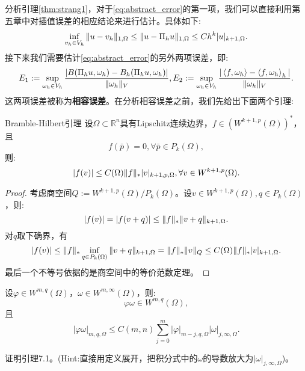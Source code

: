 分析引理\ref{thm:strang1}，对于\eqref{eq:abstract_error}的第一项，我们可以直接利用第五章中对插值误差的相应结论来进行估计。具体如下:
\begin{equation}
    \inf_{v_{h}\in V_{h}}\|u-v_{h}\|_{1,\Omega}\le\|u-\Pi_{h}u\|_{1,\Omega}\le Ch^{k}|u|_{k+1,\Omega}.
\end{equation}
接下来我们需要估计\eqref{eq:abstract_error}的另外两项误差，即:
\begin{equation}
    E_{1}:=\sup_{\omega_{h}\in V_{h}}\frac{|B(\Pi_{h}u,\omega_{h})-B_{h}(\Pi_{h}u,\omega_{h})|}{\|\omega_{h}\|_{V}},E_{2}:=\sup_{\omega_{h}\in V_{h}}\frac{|\left<f,\omega_{h}\right>-\left<f,\omega_{h}\right>_{h}|}{\|\omega_{h}\|_{V}}.
\end{equation}
这两项误差被称为\textbf{相容误差}。在分析相容误差之前，我们先给出下面两个引理:
\begin{theorem}{Bramble-Hilbert引理}
    \label{thm:B-H Lem}
   设$\Omega\subset\mathbb{R}^{n}$具有Lipschitz连续边界，$f\in (W^{k+1,p}(\Omega))^{*}$，且
   \begin{equation}
        f(\bar{p})=0,\forall \bar{p}\in P_{k}(\Omega),
   \end{equation} 
   则:
   \begin{equation}
    |f(v)|\le C(\Omega)\|f\|_{*}|v|_{k+1,p,\Omega},\forall v\in W^{k+1,p}(\Omega).
   \end{equation}
\end{theorem}
\begin{proof}
    考虑商空间$Q:=W^{k+1,p}(\Omega)/P_{k}(\Omega)$。设$v\in W^{k+1,p}(\Omega),q\in P_{k}(\Omega)$，则:
    \begin{equation}
        |f(v)|=|f(v+q)|\le\|f\|_{*}\|v+q\|_{k+1,\Omega}.
    \end{equation}
    对$q$取下确界，有
    \begin{equation}
        |f(v)|\le\|f\|_{*}\inf_{q\in P_{k}(\Omega)}\|v+q\|_{k+1,\Omega}=\|f\|_{*}\|v\|_{Q}\le C(\Omega)\|f\|_{*}|v|_{k+1,\Omega}.
    \end{equation}
    最后一个不等号依据的是商空间中的等价范数定理。
\end{proof}
\begin{lemma}
    设$\varphi\in W^{m,q}(\Omega)$，$\omega\in W^{m,\infty}(\Omega)$，则:
    \begin{equation}
        \varphi\omega\in W^{m,q}(\Omega),
    \end{equation}
    且
    \begin{equation}
        |\varphi\omega|_{m,q,\Omega}\le C(m,n)\sum_{j=0}^{m}|\varphi|_{m-j,q,\Omega}|\omega|_{j,\infty,\Omega}.
    \end{equation}
\end{lemma}
\begin{exercise}
    证明引理7.1。(Hint:直接用定义展开，把积分式中的$\omega$的导数放大为$|\omega|_{j,\infty,\Omega}$)。
\end{exercise}